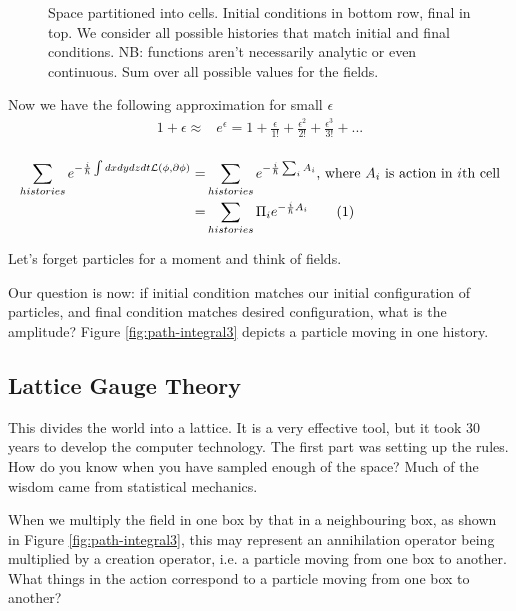 \documentclass[]{article}
\newcommand\numberthis{\addtocounter{equation}{1}\tag{\theequation}}
\begin{document}
\begin{figure}[H]
	\begin{center}
		\caption[Space partitioned into cells]{Space partitioned into cells. Initial conditions in bottom row, final in top. We consider all possible histories that match initial and final conditions. NB: functions aren't necessarily analytic or even continuous. Sum over all possible values for the fields.}\label{fig:path-integral2}
	\end{center}
\end{figure}

Now we have the following approximation for small $\epsilon$
\begin{align*}
	1 + \epsilon \approx &e^\epsilon= 1 + \frac{\epsilon}{1!} + \frac{\epsilon^2}{2!}  + \frac{\epsilon^3}{3!} +...\\
\end{align*}

\begin{align*}
	\sum_{histories} e^{-\frac{i}{\hslash} \int dx dy dz dt\mathcal{L}(\phi,\partial \phi) } =& \sum_{histories} e^{-\frac{i}{\hslash} \sum_i A_i } \text{, where $A_i$ is action in $i$th cell}\\
	=& \sum_{histories} \Pi_i e^{-\frac{i}{\hslash} A_i } \numberthis \label{eq:sum:actions}
\end{align*}

Let's forget particles for a moment and think of fields.

Our question is now: if initial condition matches our initial configuration of particles, and final condition matches desired configuration, what is the amplitude? Figure \ref{fig:path-integral3} depicts a particle moving in one history.

\subsection{Lattice Gauge Theory}

This divides the world into a lattice. It is a very effective tool, but it took 30 years to develop the computer technology. The first part was setting up the rules. How do you know when you have sampled enough of the space? Much of the wisdom came from statistical mechanics.

When we multiply the field in one box by that in a neighbouring box, as shown in Figure \ref{fig:path-integral3}, this may represent an annihilation operator being multiplied by a creation operator, i.e. a particle moving from one box to another. What things in the action correspond to a particle moving from one box to another?
\end{document}
